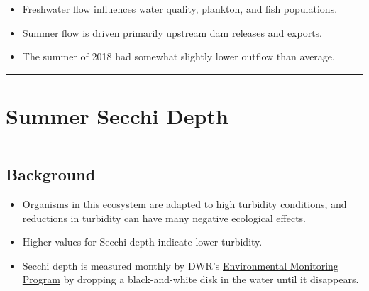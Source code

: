 \documentclass[
]{book}
\providecommand{\tightlist}{%
  \setlength{\itemsep}{0pt}\setlength{\parskip}{0pt}}
\begin{document}
\begin{itemize}
\tightlist
\item
  Freshwater flow influences water quality, plankton, and fish populations.
\item
  Summer flow is driven primarily upstream dam releases and exports.
\item
  The summer of 2018 had somewhat slightly lower outflow than average.
\end{itemize}

\begin{center}\rule{0.5\linewidth}{0.5pt}\end{center}

\hypertarget{summer-secchi-depth}{%
\section{Summer Secchi Depth}\label{summer-secchi-depth}}

\begin{column}{0.7\textwidth}
\hypertarget{background-6}{%
\subsection{Background}\label{background-6}}

\begin{itemize}
\tightlist
\item
  Organisms in this ecosystem are adapted to high turbidity conditions, and reductions in turbidity can have many negative ecological effects.
\item
  Higher values for Secchi depth indicate lower turbidity.
\item
  Secchi depth is measured monthly by DWR's \href{https://emp.baydeltalive.com/wiki/12297}{Environmental Monitoring Program} by dropping a black-and-white disk in the water until it disappears.
\end{itemize}
\end{column}
\end{document}
